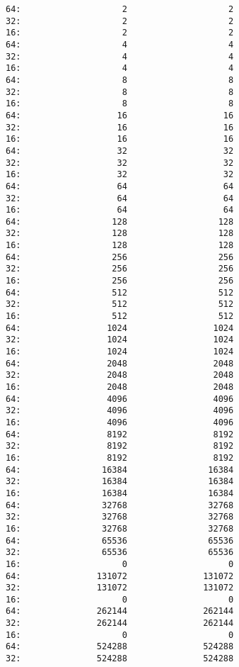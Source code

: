 \documentclass[11pt]{article}
\begin{document}
\begin{verbatim}
64:                    2                    2
32:                    2                    2
16:                    2                    2
64:                    4                    4
32:                    4                    4
16:                    4                    4
64:                    8                    8
32:                    8                    8
16:                    8                    8
64:                   16                   16
32:                   16                   16
16:                   16                   16
64:                   32                   32
32:                   32                   32
16:                   32                   32
64:                   64                   64
32:                   64                   64
16:                   64                   64
64:                  128                  128
32:                  128                  128
16:                  128                  128
64:                  256                  256
32:                  256                  256
16:                  256                  256
64:                  512                  512
32:                  512                  512
16:                  512                  512
64:                 1024                 1024
32:                 1024                 1024
16:                 1024                 1024
64:                 2048                 2048
32:                 2048                 2048
16:                 2048                 2048
64:                 4096                 4096
32:                 4096                 4096
16:                 4096                 4096
64:                 8192                 8192
32:                 8192                 8192
16:                 8192                 8192
64:                16384                16384
32:                16384                16384
16:                16384                16384
64:                32768                32768
32:                32768                32768
16:                32768                32768
64:                65536                65536
32:                65536                65536
16:                    0                    0
64:               131072               131072
32:               131072               131072
16:                    0                    0
64:               262144               262144
32:               262144               262144
16:                    0                    0
64:               524288               524288
32:               524288               524288

\end{verbatim}
\end{document}
